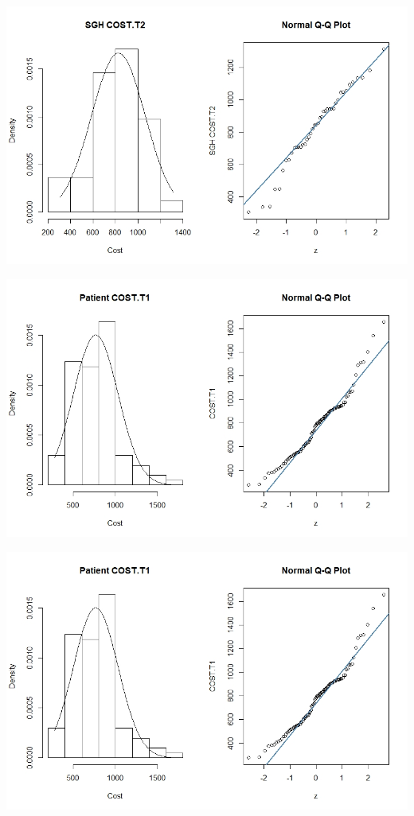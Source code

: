 \documentclass[]{article}
\begin{document}
\centering
\includegraphics[width=\textwidth]{RStudio/jpeg/Norm_SGH_T2.jpeg}
\raggedright


\centering
\includegraphics[width=\textwidth]{RStudio/jpeg/Norm_T1.jpeg}
\raggedright


\centering
\includegraphics[width=\textwidth]{RStudio/jpeg/Norm_T1.jpeg}
\raggedright
\end{document}
